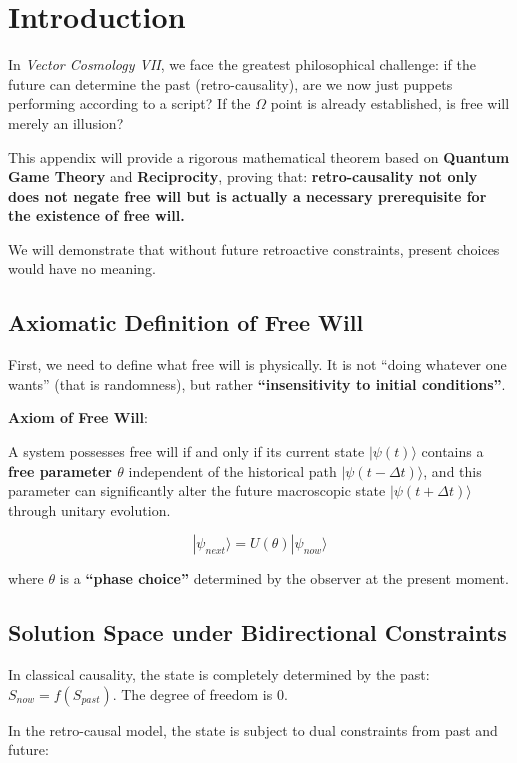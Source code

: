 \section{Introduction}

In \textit{Vector Cosmology VII}, we face the greatest philosophical challenge: if the future can determine the past (retro-causality), are we now just puppets performing according to a script? If the $\Omega$ point is already established, is free will merely an illusion?

This appendix will provide a rigorous mathematical theorem based on \textbf{Quantum Game Theory} and \textbf{Reciprocity}, proving that: \textbf{retro-causality not only does not negate free will but is actually a necessary prerequisite for the existence of free will.}

We will demonstrate that without future retroactive constraints, present choices would have no meaning.

\subsection{Axiomatic Definition of Free Will}

First, we need to define what free will is physically. It is not ``doing whatever one wants'' (that is randomness), but rather \textbf{``insensitivity to initial conditions''}.

\textbf{Axiom of Free Will}:

A system possesses free will if and only if its current state $|\psi(t)\rangle$ contains a \textbf{free parameter $\theta$} independent of the historical path $|\psi(t-\Delta t)\rangle$, and this parameter can significantly alter the future macroscopic state $|\psi(t+\Delta t)\rangle$ through unitary evolution.

\[|\psi_{next}\rangle = U(\theta) |\psi_{now}\rangle\]

where $\theta$ is a \textbf{``phase choice''} determined by the observer at the present moment.

\subsection{Solution Space under Bidirectional Constraints}

In classical causality, the state is completely determined by the past: $S_{now} = f(S_{past})$. The degree of freedom is 0.

In the retro-causal model, the state is subject to dual constraints from past and future:

